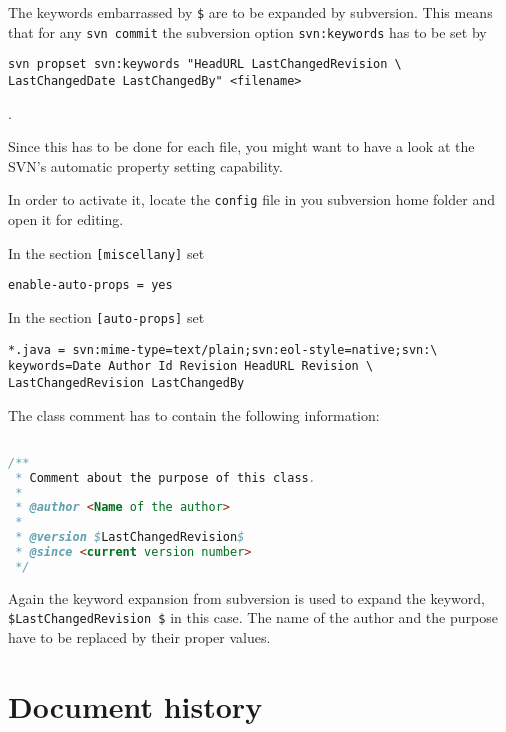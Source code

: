 \documentclass[11pt,a4paper]{article}
\begin{document}
The keywords embarrassed by \texttt{\$} are to be expanded by 
subversion. 
This means that for any \texttt{svn commit} the subversion
option \texttt{svn:keywords} has to be set by

\begin{lstlisting}
svn propset svn:keywords "HeadURL LastChangedRevision \
LastChangedDate LastChangedBy" <filename>
\end{lstlisting}.

Since this has to be done for each file, you might want to have a look
at the SVN's automatic property setting capability.

In order to activate it, locate the \texttt{config} file in you subversion home
folder and open it for editing.

In the section \texttt{[miscellany]} set
\begin{lstlisting}
enable-auto-props = yes
\end{lstlisting}

In the section \texttt{[auto-props]} set
\begin{lstlisting}
*.java = svn:mime-type=text/plain;svn:eol-style=native;svn:\
keywords=Date Author Id Revision HeadURL Revision \
LastChangedRevision LastChangedBy
\end{lstlisting}

The class comment has to contain the following information:

\begin{lstlisting}[language=Java]

/**
 * Comment about the purpose of this class.
 *
 * @author <Name of the author>
 *
 * @version $LastChangedRevision$
 * @since <current version number>
 */
\end{lstlisting}

Again the keyword expansion from subversion is used to expand the keyword,
\texttt{\$LastChangedRevision \$} in this case. The name of the author and the 
purpose have to be replaced by their proper values.

\section*{Document history}
\end{document}
